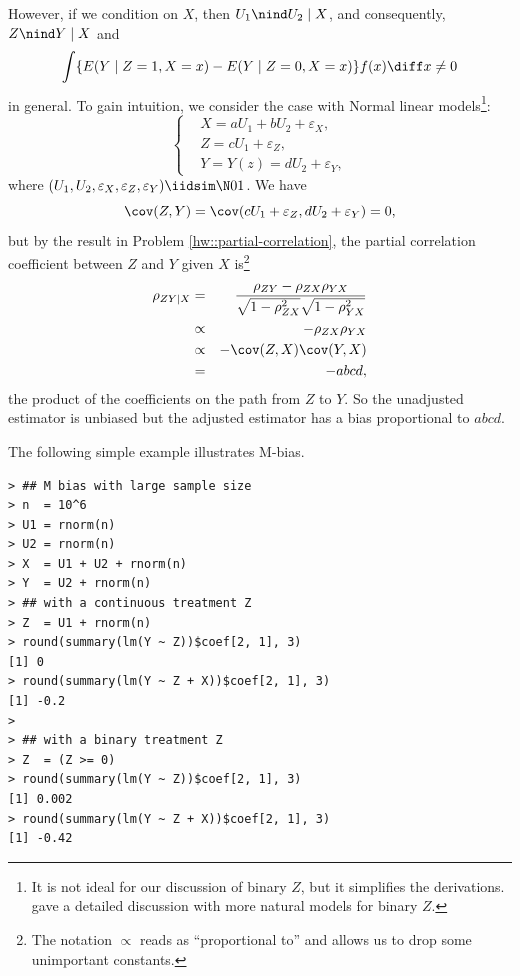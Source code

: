 However, if we condition on $X$, then $U_1\nind  U_2 \mid X$, and consequently, $Z\nind Y\mid X$ and
$$
\int \{  E(Y\mid Z=1, X=x) - E(Y\mid Z=0, X=x) \} f(x) \diff x \neq 0
$$
in general. 
To gain intuition, we consider the case with Normal linear models\footnote{It is not ideal for our discussion of binary $Z$, but it simplifies the derivations. \citet{ding2015adjust} gave a detailed discussion with more natural models for binary $Z$. }:
$$
\left\{ 
\begin{aligned}
&X = a U_1 + b U_2 +  \varepsilon_X,\\
&Z=   cU_1 +  \varepsilon_Z , \\
&Y=      Y(z) =  dU_2 +  \varepsilon_Y ,
\end{aligned}
\right. 
$$
where $(U_1, U_2, \varepsilon_X, \varepsilon_Z, \varepsilon_Y)  \iidsim \N01$. 
We have 
$$
\cov(Z,Y) = \cov(  cU_1 +  \varepsilon_Z,  dU_2 +  \varepsilon_Y) = 0,
$$
but by the result in Problem \ref{hw::partial-correlation}, the partial correlation coefficient between $Z$ and $Y$ given $X$ is\footnote{The notation $\propto$ reads as ``proportional to'' and allows us to drop some unimportant constants.}
\begin{eqnarray*}
\rho_{ZY\mid X} &=& \frac{   \rho_{ZY} - \rho_{ZX} \rho_{YX}  }{  \sqrt{  1-\rho_{ZX}^2 }  \sqrt{1- \rho_{YX}^2  }  }   
\\
&\propto &  - \rho_{ZX} \rho_{YX}  \\
&\propto &  - \cov(Z, X) \cov(Y, X)  \\
&=&  - abcd,
\end{eqnarray*}
the product of the coefficients on the path from $Z$ to $Y$. 
So the unadjusted estimator is unbiased but the adjusted estimator has a bias proportional to $abcd$. 


 
 
The following simple example illustrates M-bias.

\begin{lstlisting}
> ## M bias with large sample size
> n  = 10^6
> U1 = rnorm(n)
> U2 = rnorm(n)
> X  = U1 + U2 + rnorm(n)
> Y  = U2 + rnorm(n)
> ## with a continuous treatment Z
> Z  = U1 + rnorm(n)
> round(summary(lm(Y ~ Z))$coef[2, 1], 3)
[1] 0
> round(summary(lm(Y ~ Z + X))$coef[2, 1], 3)
[1] -0.2
> 
> ## with a binary treatment Z
> Z  = (Z >= 0)
> round(summary(lm(Y ~ Z))$coef[2, 1], 3)
[1] 0.002
> round(summary(lm(Y ~ Z + X))$coef[2, 1], 3)
[1] -0.42
\end{lstlisting}



